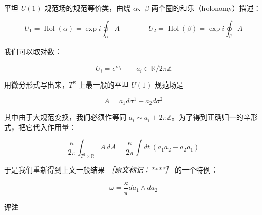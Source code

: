 平坦 $U(1)$ 规范场的规范等价类，由绕 $\alpha$、$\beta$ 两个圈的和乐（holonomy）描述：

\begin{equation}
  U_1=\operatorname{Hol}(\alpha)=\exp i\oint_\alpha A
  \qquad\qquad
  U_2=\operatorname{Hol}(\beta)=\exp i\oint_\beta A
  \tag{2.133}
  \label{eq:2.133}
\end{equation}

我们可以取对数：

\begin{equation}
  U_i=e^{ia_i} \qquad a_i\in\mathbb{R}/2\pi\mathbb{Z}
  \tag{2.134}
  \label{eq:2.134}
\end{equation}

用微分形式写出来，$T^2$ 上最一般的平坦 $U(1)$ 规范场是

\begin{equation}
  A=a_1d\sigma^1+a_2d\sigma^2
  \tag{2.135}
  \label{eq:2.135}
\end{equation}

其中由于大规范变换，我们必须作等同 $a_i\sim a_i+2\pi\mathbb{Z}$。为了得到正确归一的辛形式，把它代入作用量：

\begin{equation}
  \frac{\kappa}{2\pi}\int_{T^2\times\mathbb{R}}A\,dA
  =\frac{\kappa}{2\pi}\int dt\,(a_1\dot a_2-a_2\dot a_1)
  \tag{2.136}
  \label{eq:2.136}
\end{equation}

于是我们重新得到上文一般结果 {\small\itshape ［原文标记：****］} 的一个特例：

\begin{equation}
  \omega=\frac{\kappa}{\pi}da_1\wedge da_2
  \tag{2.137}
  \label{eq:2.137}
\end{equation}

\textbf{评注}

